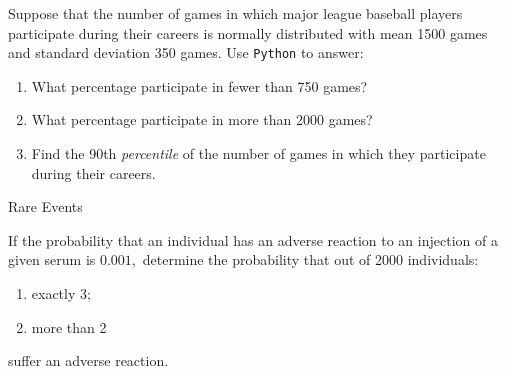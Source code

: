 \begin{ejemplo}
  \label{exmp:2.10.11}
  Suppose that the number of games in which major league baseball players participate during their careers is normally distributed with mean 1500 games and standard deviation 350 games. Use \texttt{Python} to answer:
  \begin{enumerate}
   \item What percentage participate in fewer than 750 games?
   \item What percentage participate in more than 2000 games?
   \item Find the 90th \emph{percentile} of the number of games in which they participate during their careers.
  \end{enumerate}
\end{ejemplo}



{Rare Events}
\begin{ejemplo}
\label{exmp:2.10.12}
If the probability that an individual has an adverse reaction to an injection of a given serum is $0.001,$ determine the probability that out of 2000 individuals:
 \begin{enumerate}
  \item exactly 3;
  \item more than 2
 \end{enumerate}
suffer an adverse reaction.
\end{ejemplo}


